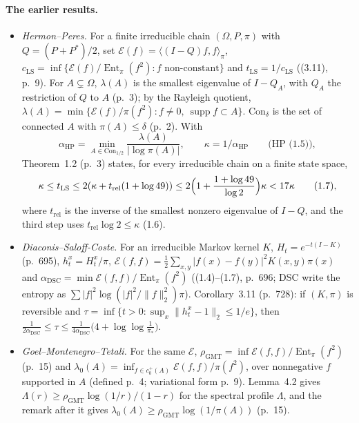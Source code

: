 \documentclass[11pt]{article}
\DeclareMathOperator{\Ent}{Ent}
\newcommand{\norm}[1]{\lVert #1\rVert}
\newcommand{\ip}[2]{\langle #1,#2\rangle}
\begin{document}
\paragraph{The earlier results.}
\begin{itemize}
\item \emph{Hermon--Peres.} For a finite irreducible chain $(\Omega,P,\pi)$
 with $Q=(P+P^*)/2$, set $\mathcal E(f)=\ip{(I-Q)f}{f}_\pi$,
 $c_{\mathrm{LS}}=\inf\{\mathcal E(f)/\Ent_\pi(f^2):f\text{ non-constant}\}$
 and $t_{\mathrm{LS}}=1/c_{\mathrm{LS}}$ ((3.11), p.~9). For $A\subsetneq\Omega$,
 $\lambda(A)$ is the smallest eigenvalue of $I-Q_A$, with $Q_A$ the
 restriction of $Q$ to $A$ (p.~3); by the Rayleigh quotient,
 $\lambda(A)=\min\{\mathcal E(f)/\pi(f^2):f\ne0,\ \operatorname{supp}f\subset A\}$.
 $\mathrm{Con}_\delta$ is the set of connected $A$ with $\pi(A)\le\delta$
 (p.~2). With
 \[
  \alpha_{\mathrm{HP}}=\min_{A\in\mathrm{Con}_{1/2}}\frac{\lambda(A)}{|\log\pi(A)|},\qquad
  \kappa=1/\alpha_{\mathrm{HP}} \qquad\text{(HP (1.5))},
 \]
 Theorem~1.2 (p.~3) states, for every irreducible chain on a finite state
 space,
 \[
  \kappa\le t_{\mathrm{LS}}\le2(\kappa+t_{\mathrm{rel}}(1+\log49))
  \le2\Bigl(1+\frac{1+\log49}{\log2}\Bigr)\kappa<17\kappa
  \qquad\text{(1.7)},
 \]
 where $t_{\mathrm{rel}}$ is the inverse of the smallest nonzero eigenvalue of
 $I-Q$, and the third step uses $t_{\mathrm{rel}}\log2\le\kappa$ (1.6).
\item \emph{Diaconis--Saloff-Coste.} For an irreducible Markov kernel $K$,
 $H_t=e^{-t(I-K)}$ (p.~695), $h_t^x=H_t^x/\pi$,
 $\mathcal E(f,f)=\frac12\sum_{x,y}|f(x)-f(y)|^2K(x,y)\pi(x)$ and
 $\alpha_{\mathrm{DSC}}=\min\mathcal E(f,f)/\Ent_\pi(f^2)$ ((1.4)--(1.7),
 p.~696; DSC write the entropy as $\sum|f|^2\log(|f|^2/\norm f_2^2)\pi$).
 Corollary~3.11 (p.~728): if $(K,\pi)$ is reversible and
 $\tau=\inf\{t>0:\sup_x\norm{h_t^x-1}_2\le1/e\}$, then
 $\frac1{2\alpha_{\mathrm{DSC}}}\le\tau\le\frac1{4\alpha_{\mathrm{DSC}}}
 \bigl(4+\log\log\frac1{\pi_*}\bigr)$.
\item \emph{Goel--Montenegro--Tetali.} For the same $\mathcal E$,
 $\rho_{\mathrm{GMT}}=\inf\mathcal E(f,f)/\Ent_\pi(f^2)$ (p.~15) and
 $\lambda_0(A)=\inf_{f\in c_0^+(A)}\mathcal E(f,f)/\pi(f^2)$, over nonnegative
 $f$ supported in $A$ (defined p.~4; variational form p.~9). Lemma~4.2 gives
 $\Lambda(r)\ge\rho_{\mathrm{GMT}}\log(1/r)/(1-r)$ for the spectral profile
 $\Lambda$, and the remark after it gives
 $\lambda_0(A)\ge\rho_{\mathrm{GMT}}\log(1/\pi(A))$ (p.~15).
\end{itemize}
\end{document}

